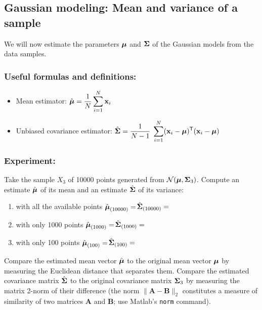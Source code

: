 \documentclass[a4paper]{article}
\newcommand{\com}[1]{{\tt #1}}
\newcommand{\trn}{^{\mathsf T}} %
\newcommand{\xv}{\ensuremath\mathbf{x}}  %
\newcommand{\muv}{\ensuremath\boldsymbol{\mu}}  %
\newcommand{\Sm}{\ensuremath\boldsymbol{\Sigma}}  %
\begin{document}
\subsection{Gaussian modeling: Mean and variance of a sample}

We will now estimate the parameters $\muv$ and $\Sm$ of the Gaussian
models from the data samples.

\subsubsection*{Useful formulas and definitions:}
\begin{itemize}
\item Mean estimator: $\displaystyle \hat{\muv} = \frac{1}{N}
  \sum_{i=1}^{N} \xv_i$
\item Unbiased covariance estimator: $\displaystyle \hat{\Sm} =
  \frac{1}{N-1} \; \sum_{i=1}^{N} (\xv_i-\muv)\trn (\xv_i-\muv) $
\end{itemize}

\subsubsection{Experiment:}
Take the sample $X_3$ of 10000 points generated from ${\cal
  N}(\muv,\Sm_3)$. Compute an estimate $\hat{\muv}$ of its mean and an
estimate $\hat{\Sm}$ of its variance:
\begin{enumerate}
\item with all the available points \hspace{1cm}$\hat{\muv}_{(10000)}
  =$\hspace{3.5cm}$\hat{\Sm}_{(10000)} =$ \vspace{0.8cm}
\item with only 1000 points \hspace{1.95cm}$\hat{\muv}_{(1000)}
  =$\hspace{3.7cm}$\hat{\Sm}_{(1000)} =$ \vspace{0.8cm}
\item with only 100 points \hspace{2.2cm}$\hat{\muv}_{(100)}
  =$\hspace{3.9cm}$\hat{\Sm}_{(100)} =$ \vspace{0.8cm}
\end{enumerate}
Compare the estimated mean vector $\hat{\muv}$ to the original mean
vector $\muv$ by measuring the Euclidean distance that separates them.
Compare the estimated covariance matrix $\hat{\Sm}$ to the original
covariance matrix $\Sm_3$ by measuring the matrix 2-norm of their
difference (the norm $\|\mathbf{A}-\mathbf{B}\|_2$ constitutes a
measure of similarity of two matrices $\mathbf{A}$ and $\mathbf{B}$;
use {\sc Matlab}'s \com{norm} command).
\end{document}
